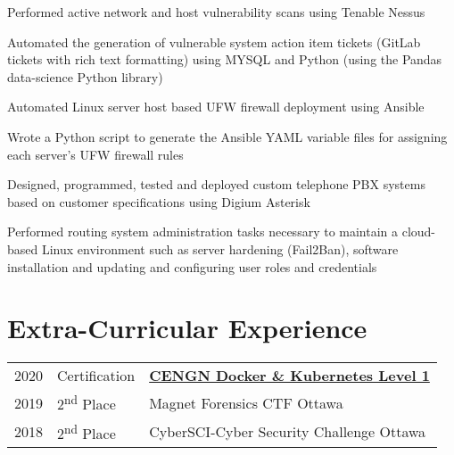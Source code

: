 \documentclass[letterpaper]{deedy-resume} %
\begin{document}
\begin{minipage}[t]{0.66\textwidth}
\sectionspace %



\begin{tightitemize}
\item Performed active network and host vulnerability scans using Tenable Nessus
\item Automated the generation of vulnerable system action item tickets (GitLab tickets with rich text formatting) using MYSQL and Python (using the Pandas data-science Python library)
\item Automated Linux server host based UFW firewall deployment using Ansible
\item Wrote a Python script to generate the Ansible YAML variable files for assigning each server’s UFW firewall rules
\end{tightitemize}

\sectionspace %


\begin{tightitemize}
	\item Designed, programmed, tested and deployed custom telephone PBX systems based on customer specifications using Digium Asterisk
	\item Performed routing system administration tasks necessary to maintain a cloud-based Linux environment such as server hardening (Fail2Ban), software installation and updating and configuring user roles and credentials 
\end{tightitemize}

\section{Extra-Curricular Experience} 

\begin{tabular}{rll}
2020	 & Certification & \href{https://www.credly.com/badges/7a6c2383-9563-4d67-9878-a40bee831e53?source=linked_in_profile}{\bf CENGN Docker \& Kubernetes Level 1} \\
2019	 & 2\textsuperscript{nd} Place & Magnet Forensics CTF Ottawa \\
2018	 & 2\textsuperscript{nd} Place & CyberSCI-Cyber Security Challenge Ottawa\\
\end{tabular}

\end{minipage} %
\end{document}
